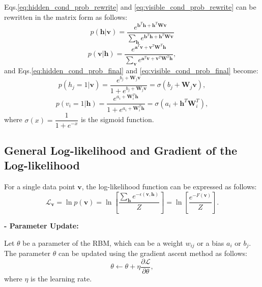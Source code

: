 \documentclass[10pt, a4paper]{article}
\begin{document}
Eqs.\eqref{eq:hidden_cond_prob_rewrite} and \eqref{eq:visible_cond_prob_rewrite}
can be rewritten in the matrix form as follows:
\begin{equation}
  p(\mathbf{h}|\mathbf{v}) = \dfrac{e^{\mathbf{b}^T \mathbf{h} + \mathbf{h}^T \mathbf{W} \mathbf{v}}}
  {\sum_{\mathbf{h}} e^{\mathbf{b}^T \mathbf{h} + \mathbf{h}^T \mathbf{W} \mathbf{v}}}
  \label{eq:hidden_cond_prob_matrix}
\end{equation}
\begin{equation}
  p(\mathbf{v}|\mathbf{h}) = \dfrac{e^{\mathbf{a}^T \mathbf{v} + \mathbf{v}^T \mathbf{W}^T \mathbf{h}}}
  {\sum_{\mathbf{v}} e^{\mathbf{a}^T \mathbf{v} + \mathbf{v}^T \mathbf{W}^T \mathbf{h}}},
  \label{eq:visible_cond_prob_matrix}
\end{equation}
and Eqs.\eqref{eq:hidden_cond_prob_final} and \eqref{eq:visible_cond_prob_final} become:
\begin{equation}
  p(h_j=1|\mathbf{v}) = \dfrac{e^{b_j + \mathbf{W}_j \mathbf{v}}}{1 + e^{b_j + \mathbf{W}_j \mathbf{v}}}
  =\sigma(b_j + \mathbf{W}_j \mathbf{v}),
  \label{eq:hidden_cond_prob_final_matrix}
\end{equation}
\begin{equation}
  p(v_i=1|\mathbf{h}) = \dfrac{e^{a_i + \mathbf{W}^T_i \mathbf{h}}}{1 + e^{a_i + \mathbf{W}^T_i \mathbf{h}}}
  =\sigma(a_i + \mathbf{h}^T\mathbf{W}^T_i ),
  \label{eq:visible_cond_prob_final_matrix}
\end{equation}
where $\sigma(x) = \dfrac{1}{1 + e^{-x}}$ is the sigmoid function.

\subsection{General Log-likelihood and Gradient of the Log-likelihood}
 For a single data point $\mathbf{v}$, the log-likelihood function can be expressed as follows:
\begin{equation}
  \mathcal{L}_{\mathbf{v}} = \ln p(\mathbf{v}) = 
  \ln \left[\dfrac{\sum_{\mathbf{h}} e^{-\epsilon(\mathbf{v}, \mathbf{h})}}{Z}\right]
  = \ln \left[\dfrac{e^{-F(\mathbf{v})}}{Z}\right].
  \label{eq:log_likelihood_free_energy}
\end{equation}

\noindent\textbf{- Parameter Update:} 
\begin{samplebox}
  Let $\theta$ be a parameter of the RBM, which can be a weight $w_{ij}$ or a bias $a_i$ or $b_j$.
  The parameter $\theta$ can be updated using the gradient ascent method as follows:
  \begin{equation}
    \theta \leftarrow \theta + \eta \dfrac{\partial \mathcal{L}}{\partial \theta},
     \label{eq:parameter_update}
  \end{equation}
  where $\eta$ is the learning rate.
\end{samplebox}
\end{document}
